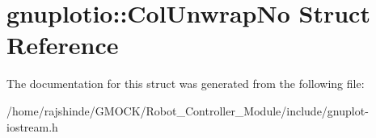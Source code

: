 \hypertarget{structgnuplotio_1_1_col_unwrap_no}{}\section{gnuplotio\+:\+:Col\+Unwrap\+No Struct Reference}
\label{structgnuplotio_1_1_col_unwrap_no}


The documentation for this struct was generated from the following file\+:\begin{DoxyCompactItemize}
\item 
/home/rajshinde/\+G\+M\+O\+C\+K/\+Robot\+\_\+\+Controller\+\_\+\+Module/include/gnuplot-\/iostream.\+h\end{DoxyCompactItemize}
